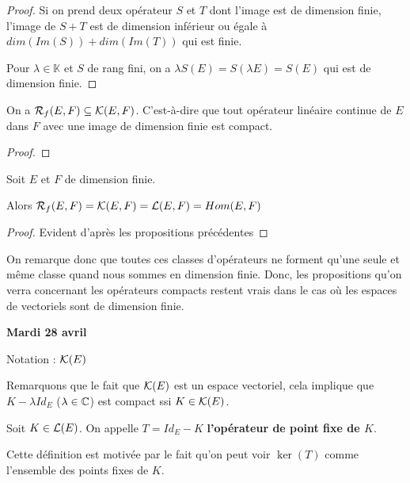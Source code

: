 \begin{proof}
	Si on prend deux opérateur $S$ et $T$ dont l'image est de dimension finie,
	l'image de $S + T$ est de dimension inférieur ou égale à $dim(Im(S)) +
	dim(Im(T))$ qui est finie.

	Pour $\lambda \in \mathbb{K}$ et $S$ de rang fini, on a $\lambda S(E) =
	S(\lambda E) = S(E)$ qui est de dimension finie.
\end{proof}

\begin{proposition}
	On a $\mathcal{R}_{f}(E, F) \subseteq \mathcal{K}(E, F)$. C'est-à-dire
	que tout opérateur linéaire continue de $E$ dans $F$ avec une image de
	dimension finie est compact.
\end{proposition}

\begin{proof}

\end{proof}

\begin{proposition}
	Soit $E$ et $F$ de dimension finie.

	Alors $\mathcal{R}_{f}(E, F) = \mathcal{K}(E, F) =
	\mathcal{L}(E, F) = Hom(E, F)$
\end{proposition}

\begin{proof}
	Evident d'après les propositions précédentes
\end{proof}

On remarque donc que toutes ces classes d'opérateurs ne forment qu'une seule et
même classe quand nous sommes en dimension finie. Donc, les propositions qu'on
verra concernant les opérateurs compacts restent vrais dans le cas où les
espaces de vectoriels sont de dimension finie.




\textbf{Mardi 28 avril}

Notation : $\mathcal{K}(E)$

Remarquons que le fait que $\mathcal{K}(E)$ est un espace vectoriel, cela
implique que $K - \lambda Id_{E}$ ($\lambda \in \mathbb{C}$) est compact ssi $K
\in
\mathcal{K}(E)$.

\begin{definition} 
	Soit $K \in \mathcal{L}(E)$. On appelle $T = Id_{E} - K$
	\textbf{l'opérateur de point fixe de $K$}.

	Cette définition est motivée par le fait qu'on peut voir $\ker(T)$ comme
	l'ensemble des points fixes de $K$.
\end{definition}

